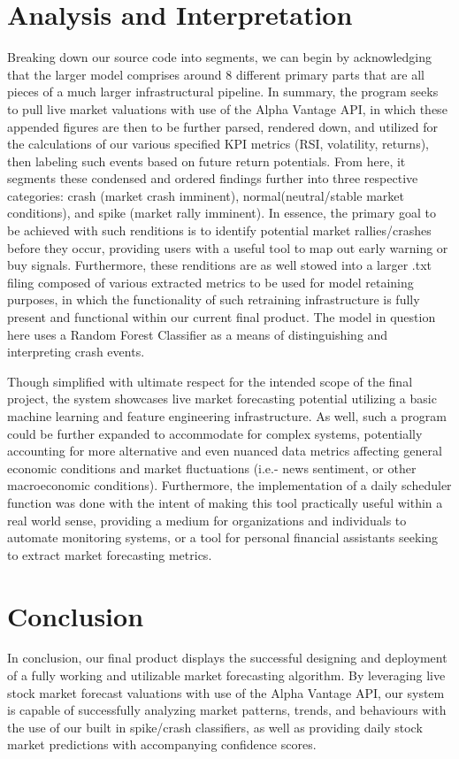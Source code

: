 \documentclass[runningheads]{llncs}
\begin{document}
\section{Analysis and Interpretation}
Breaking down our source code into segments, we can begin by acknowledging that the larger model comprises around 8 different primary parts that are all pieces of a much larger infrastructural pipeline. In summary, the program seeks to pull live market valuations with use of the Alpha Vantage API, in which these appended figures are then to be further parsed, rendered down, and utilized for the calculations of our various specified KPI metrics (RSI, volatility, returns), then labeling such events based on future return potentials. From here, it segments these condensed and ordered findings further into three respective categories: crash (market crash imminent), normal(neutral/stable market conditions), and spike (market rally imminent). In essence, the primary goal to be achieved with such renditions is to identify potential market rallies/crashes before they occur, providing users with a useful tool to map out early warning or buy signals. Furthermore, these renditions are as well stowed into a larger .txt filing composed of various extracted metrics to be used for model retaining purposes, in which the functionality of such retraining infrastructure is fully present and functional within our current final product. The model in question here uses a Random Forest Classifier as a means of distinguishing and interpreting crash events. 

Though simplified with ultimate respect for the intended scope of the final project, the system showcases live market forecasting potential utilizing a basic machine learning and feature engineering infrastructure. As well, such a program could be further expanded to accommodate for complex systems, potentially accounting for more alternative and even nuanced data metrics affecting general economic conditions and market fluctuations (i.e.- news sentiment, or other macroeconomic conditions). Furthermore, the implementation of a daily scheduler function was done with the intent of making this tool practically useful within a real world sense, providing a medium for organizations and individuals to automate monitoring systems, or a tool for personal financial assistants seeking to extract market forecasting metrics.

\section{Conclusion}
In conclusion, our final product displays the successful designing and deployment of a fully working and utilizable market forecasting algorithm. By leveraging  live stock market forecast valuations with use of the Alpha Vantage API, our system is capable of successfully analyzing market patterns, trends, and behaviours with the use of our built in spike/crash classifiers, as well as providing daily stock market predictions with accompanying confidence scores. 
\end{document}
